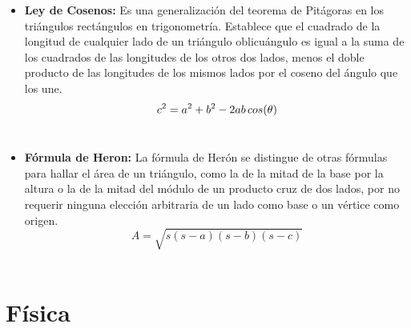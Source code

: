 \documentclass[letterpaper, 12pt]{article}
\begin{document}
\begin{itemize}
        \item \textbf{Ley de Cosenos:} Es una generalización del teorema de Pitágoras en los triángulos rectángulos en trigonometría. Establece que el cuadrado de la longitud de cualquier lado de un triángulo oblicuángulo es igual a la suma de los cuadrados de las longitudes de los otros dos lados, menos el doble producto de las longitudes de los mismos lados por el coseno del ángulo que los une.\\
        
            \begin{equation*}
                c^2=a^2+b^2-2ab\thinspace cos(\theta)
            \end{equation*}\\
            
        \item \textbf{Fórmula de Heron:} La fórmula de Herón se distingue de otras fórmulas para hallar el área de un triángulo, como la de la mitad de la base por la altura o la de la mitad del módulo de un producto cruz de dos lados, por no requerir ninguna elección arbitraria de un lado como base o un vértice como origen. \\
        
            \begin{equation*}
                A = \sqrt{s(s-a)(s-b)(s-c)}
            \end{equation*}\\
    
    \end{itemize}
    
    \newpage
        
    
\section{Física}
\end{document}
